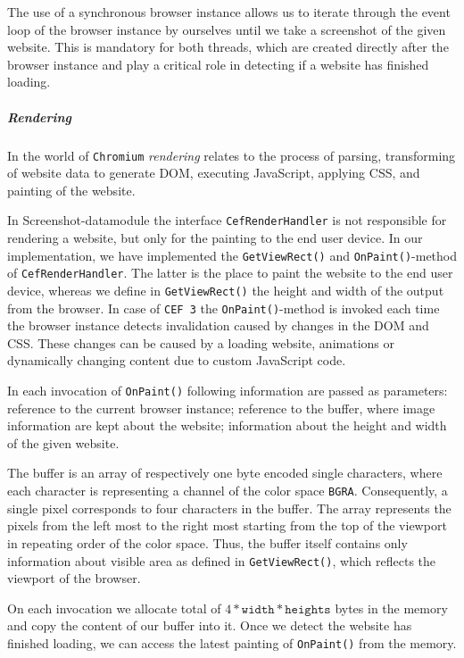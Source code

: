 The use of a synchronous browser instance allows us to iterate through the event loop of the browser instance by ourselves until we take a screenshot of the given website. This is mandatory for both threads, which are created directly after the browser instance and play a critical role in detecting if a website has finished loading. 

\subparagraph*{Rendering}
In the world of \texttt{Chromium} \textit{rendering} relates to the process of parsing, transforming of website data to generate DOM, executing JavaScript, applying CSS, and painting of the website. 

In Screenshot-datamodule the interface \texttt{CefRenderHandler} is not responsible for rendering a website, but only for the painting to the end user device. In our implementation, we have implemented the \texttt{GetViewRect()} and \texttt{OnPaint()}-method of \texttt{CefRenderHandler}. The latter is the place to paint the website to the end user device, whereas we define in \texttt{GetViewRect()} the height and width of the output from the browser. In case of \texttt{CEF 3} the \texttt{OnPaint()}-method is invoked each time the browser instance detects invalidation caused by changes in the DOM and CSS. These changes can be caused by a loading website, animations or dynamically changing content due to custom JavaScript code.

In each invocation of \texttt{OnPaint()} following information are passed as parameters: reference to the current browser instance; reference to the buffer, where image information are kept about the website; information about the height and width of the given website.

The buffer is an array of respectively one byte encoded single characters, where each character is representing a channel of the color space \texttt{BGRA}. Consequently, a single pixel corresponds to four characters in the buffer. The array represents the pixels from the left most to the right most starting from the top of the viewport in repeating order of the color space. Thus, the buffer itself contains only information about visible area as defined in \texttt{GetViewRect()}, which reflects the viewport of the browser.

On each invocation we allocate total of $4 * \texttt{width} * \texttt{heights}$ bytes in the memory and copy the content of our buffer into it. Once we detect the website has finished loading, we can access the latest painting of \texttt{OnPaint()} from the memory.

